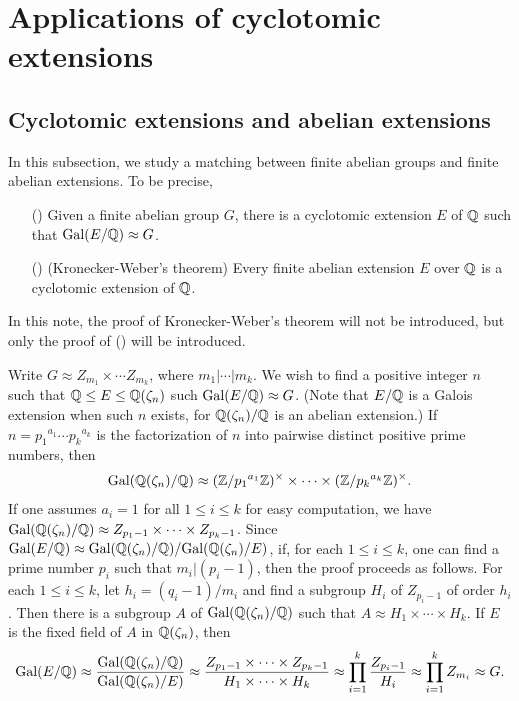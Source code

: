 \section{Applications of cyclotomic extensions}

\subsection{Cyclotomic extensions and abelian extensions}

In this subsection, we study a matching between finite abelian groups and finite abelian extensions.
To be precise,
\begin{enumerate}
    \item[(\Romannumeral{1})]
    {
        Given a finite abelian group $G$, there is a cyclotomic extension $E$ of ${\mathbb{Q}}$ such that ${\textrm{Gal}({E/{\mathbb{Q}}})}\approx G$.
    }
    \item[(\Romannumeral{2})]
    {
        (Kronecker-Weber's theorem)
        Every finite abelian extension $E$ over ${\mathbb{Q}}$ is a cyclotomic extension of ${\mathbb{Q}}$.
    }
\end{enumerate}
In this note, the proof of Kronecker-Weber's theorem will not be introduced, but only the proof of () will be introduced.
\begin{sketch}
    Write $G\approx Z_{m_1}\times\cdots Z_{m_k}$, where $m_1|\cdots|m_k$.
    We wish to find a positive integer $n$ such that ${\mathbb{Q}}\leq E\leq{\mathbb{Q}}(\zeta_n)$ such ${\textrm{Gal}({E/{\mathbb{Q}}})}\approx G$.
    (Note that $E/{\mathbb{Q}}$ is a Galois extension when such $n$ exists, for ${\mathbb{Q}}(\zeta_n)/{\mathbb{Q}}$ is an abelian extension.)
    If $n={p_1}^{a_1}\cdots{p_k}^{a_k}$ is the factorization of $n$ into pairwise distinct positive prime numbers, then
    \begin{align*}
        {\textrm{Gal}({{\mathbb{Q}}(\zeta_n)/{\mathbb{Q}}})}\approx({\mathbb{Z}}/{p_1}^{a_1}{\mathbb{Z}})^\times\times\cdots\times({\mathbb{Z}}/{p_k}^{a_k}{\mathbb{Z}})^\times.
    \end{align*}
    If one assumes $a_i=1$ for all $1\leq i\leq k$ for easy computation, we have ${\textrm{Gal}({{\mathbb{Q}}(\zeta_n)/{\mathbb{Q}}})}\approx Z_{p_1-1}\times\cdots\times Z_{p_k-1}$. 
    Since ${\textrm{Gal}({E/{\mathbb{Q}}})}\approx{\textrm{Gal}({{\mathbb{Q}}(\zeta_n)/{\mathbb{Q}}})}/{\textrm{Gal}({{\mathbb{Q}}(\zeta_n)/E})}$, \color{teal}if, for each $1\leq i\leq k$, one can find a prime number $p_i$ such that $m_i|(p_i-1)$\color{black}, then the proof proceeds as follows.
    For each $1\leq i\leq k$, let $h_i=(q_i-1)/{m_i}$ and find a subgroup $H_i$ of $Z_{p_i-1}$ of order $h_i$.
    Then there is a subgroup $A$ of ${\textrm{Gal}({{\mathbb{Q}}(\zeta_n)/{\mathbb{Q}}})}$ such that $A\approx H_1\times\cdots\times H_k$.
    If $E$ is the fixed field of $A$ in ${\mathbb{Q}}(\zeta_n)$, then
    \begin{align*}
        {\textrm{Gal}({E/{\mathbb{Q}}})}
        \approx\frac{{\textrm{Gal}({{\mathbb{Q}}(\zeta_n)/{\mathbb{Q}}})}}{{\textrm{Gal}({{\mathbb{Q}}(\zeta_n)/E})}}
        \approx\frac{Z_{p_1-1}\times\cdots\times Z_{p_k-1}}{H_1\times\cdots\times H_k}
        \approx\prod_{i=1}^k\frac{Z_{p_i-1}}{H_i}
        \approx\prod_{i=1}^k Z_{m_i}
        \approx G.
    \end{align*}
\end{sketch}


